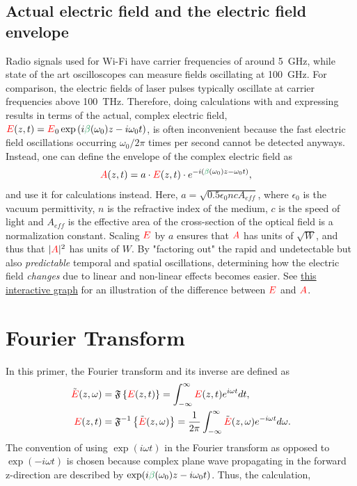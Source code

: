 \subsection{Actual electric field and the electric field envelope}
Radio signals used for Wi-Fi have carrier frequencies of around 5~GHz, while state of the art oscilloscopes can measure fields oscillating at 100~GHz. For comparison, the electric fields of laser pulses typically oscillate at carrier frequencies above 100~THz. Therefore, doing calculations with and expressing results in terms of the actual, complex electric field, $\E(z,t) =\E_0 \exp\left( i\betag(\omega_0)z-i\omega_0 t\right)$, is often inconvenient because the fast electric field oscillations occurring $\omega_0/2\pi$ times per second cannot be detected anyways. Instead, one can define the envelope of the complex electric field as
\begin{align}
\label{eq:envelope}
    \A(z,t) &=a\cdot\E(z,t)\cdot e^{-i(\betag(\omega_0)z-\omega_0t)},
\end{align}
and use it for calculations instead. Here, $a=\sqrt{0.5\epsilon_0ncA_{eff}}$, where $\epsilon_0$ is the vacuum permittivity, $n$ is the refractive index of the medium, $c$ is the speed of light and $A_{eff}$ is the effective area of the cross-section of the optical field is a normalization constant. Scaling $\textcolor{red}{E}$ by $a$ ensures that $\textcolor{red}{A}$ has units of $\sqrt{W}$, and thus that $|\textcolor{red}{A}|^2$ has units of $W$. By "factoring out" the rapid and undetectable but also \emph{predictable} temporal and spatial oscillations, determining how the electric field \emph{changes} due to linear and non-linear effects becomes easier. See \href{https://www.desmos.com/calculator/rsw2fn5af6 }{this interactive graph} for an illustration of the difference between $\textcolor{red}{E}$ and $\textcolor{red}{A}$. 



\section{Fourier Transform}

In this primer, the Fourier transform and its inverse are defined as
\begin{align}
    \Tilde{\textcolor{red}{E}}(z,\omega) &= \mathfrak{F}\left\{\textcolor{red}{E}(z,t)\right\} = \int_{-\infty}^{\infty} \textcolor{red}{E}(z,t) e^{i\omega t} dt, \\ \nonumber
    \textcolor{red}{E}(z,t) &= \mathfrak{F}^{-1}\left\{\Tilde{\textcolor{red}{E}}(z,\omega)\right\} = \frac{1}{2\pi} \int_{-\infty}^{\infty} \Tilde{\textcolor{red}{E}}(z,\omega) e^{-i\omega t} d\omega.
\end{align}
The convention of using $\exp(i\omega t)$ in the Fourier transform as opposed to $\exp(-i\omega t)$ is chosen because complex plane wave propagating in the forward z-direction are described by $\exp(i\betag(\omega_0)z-i\omega_0 t)$. Thus, the calculation,

